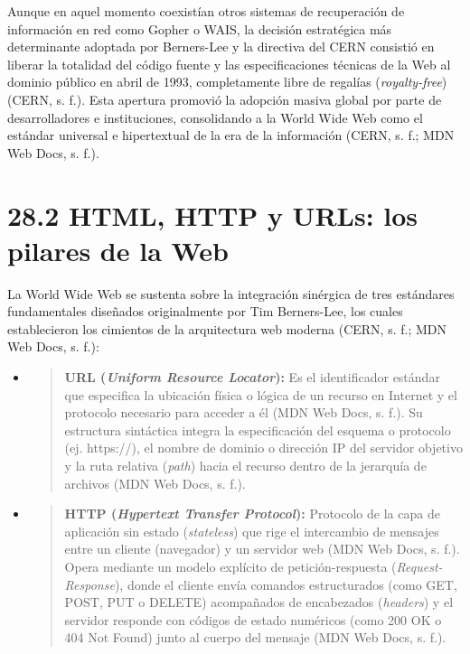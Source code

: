 Aunque en aquel momento coexistían otros sistemas de recuperación de
información en red como Gopher o WAIS, la decisión estratégica más
determinante adoptada por Berners-Lee y la directiva del CERN consistió
en liberar la totalidad del código fuente y las especificaciones
técnicas de la Web al dominio público en abril de 1993, completamente
libre de regalías (\emph{royalty-free}) (CERN, s. f.). Esta apertura
promovió la adopción masiva global por parte de desarrolladores e
instituciones, consolidando a la World Wide Web como el estándar
universal e hipertextual de la era de la información (CERN, s. f.; MDN
Web Docs, s. f.).

\hypertarget{html-http-y-urls-los-pilares-de-la-web}{%
\section{\texorpdfstring{\textbf{28.2 HTML, HTTP y URLs: los pilares de
la
Web}}{28.2 HTML, HTTP y URLs: los pilares de la Web}}\label{html-http-y-urls-los-pilares-de-la-web}}

La World Wide Web se sustenta sobre la integración sinérgica de tres
estándares fundamentales diseñados originalmente por Tim Berners-Lee,
los cuales establecieron los cimientos de la arquitectura web moderna
(CERN, s. f.; MDN Web Docs, s. f.):

\begin{itemize}
\item
  \begin{quote}
  \textbf{URL (\emph{Uniform Resource Locator}):} Es el identificador
  estándar que especifica la ubicación física o lógica de un recurso en
  Internet y el protocolo necesario para acceder a él (MDN Web Docs, s.
  f.). Su estructura sintáctica integra la especificación del esquema o
  protocolo (ej. https://), el nombre de dominio o dirección IP del
  servidor objetivo y la ruta relativa (\emph{path}) hacia el recurso
  dentro de la jerarquía de archivos (MDN Web Docs, s. f.).
  \end{quote}
\item
  \begin{quote}
  \textbf{HTTP (\emph{Hypertext Transfer Protocol}):} Protocolo de la
  capa de aplicación sin estado (\emph{stateless}) que rige el
  intercambio de mensajes entre un cliente (navegador) y un servidor web
  (MDN Web Docs, s. f.). Opera mediante un modelo explícito de
  petición-respuesta (\emph{Request-Response}), donde el cliente envía
  comandos estructurados (como GET, POST, PUT o DELETE) acompañados de
  encabezados (\emph{headers}) y el servidor responde con códigos de
  estado numéricos (como 200 OK o 404 Not Found) junto al cuerpo del
  mensaje (MDN Web Docs, s. f.).
  \end{quote}
\end{itemize}

